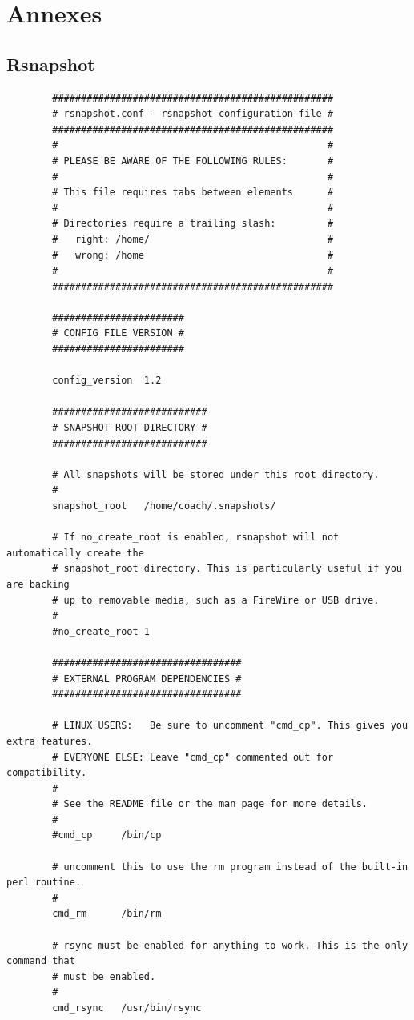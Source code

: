 \documentclass[a4paper]{report}
\begin{document}
\chapter{Annexes}
\section{Rsnapshot}
	\begin{lstlisting}
		#################################################
		# rsnapshot.conf - rsnapshot configuration file #
		#################################################
		#                                               #
		# PLEASE BE AWARE OF THE FOLLOWING RULES:       #
		#                                               #
		# This file requires tabs between elements      #
		#                                               #
		# Directories require a trailing slash:         #
		#   right: /home/                               #
		#   wrong: /home                                #
		#                                               #
		#################################################

		#######################
		# CONFIG FILE VERSION #
		#######################

		config_version	1.2

		###########################
		# SNAPSHOT ROOT DIRECTORY #
		###########################

		# All snapshots will be stored under this root directory.
		#
		snapshot_root	/home/coach/.snapshots/

		# If no_create_root is enabled, rsnapshot will not automatically create the
		# snapshot_root directory. This is particularly useful if you are backing
		# up to removable media, such as a FireWire or USB drive.
		#
		#no_create_root	1

		#################################
		# EXTERNAL PROGRAM DEPENDENCIES #
		#################################

		# LINUX USERS:   Be sure to uncomment "cmd_cp". This gives you extra features.
		# EVERYONE ELSE: Leave "cmd_cp" commented out for compatibility.
		#
		# See the README file or the man page for more details.
		#
		#cmd_cp		/bin/cp

		# uncomment this to use the rm program instead of the built-in perl routine.
		#
		cmd_rm		/bin/rm

		# rsync must be enabled for anything to work. This is the only command that
		# must be enabled.
		#
		cmd_rsync	/usr/bin/rsync


\end{lstlisting}
\end{document}
